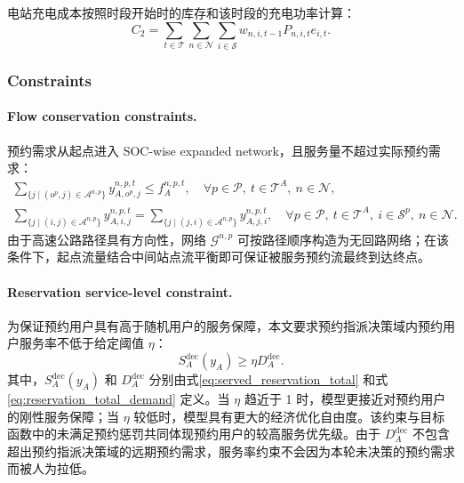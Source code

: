 \documentclass[12pt,hyperref,a4paper,UTF8]{ctexart}
\begin{document}
电站充电成本按照时段开始时的库存和该时段的充电功率计算：
\begin{equation}
C_2 = \sum_{t \in \mathcal{T}}  \sum_{n \in \mathcal{N}} \sum_{i \in \mathcal{S}}
 w_{n,i,t-1}P_{n,i,t}e_{i,t}.
\label{eq:chargingcost}
\end{equation}

\subsubsection{Constraints}

\paragraph{Flow conservation constraints.}
预约需求从起点进入 SOC-wise expanded network，且服务量不超过实际预约需求：
\begin{subequations}
\label{eq:flow}
\begin{gather}
\sum_{\{j\mid (o^p,j)\in \mathcal{A}^{n,p}\}}{y_{A,o^p,j}^{n,p,t}} \leq f_A^{n,p,t},
\quad \forall p\in \mathcal{P},\ t\in \mathcal{T}^{A},\ n \in \mathcal{N},\label{eq:flow1}\\
\sum_{\{j\mid (i,j)\in \mathcal{A}^{n,p}\}}{y_{A,i,j}^{n,p,t}} =
\sum_{\{j\mid (j,i)\in \mathcal{A}^{n,p}\}}{y_{A,j,i}^{n,p,t}},
\quad \forall p\in \mathcal{P},\ t\in \mathcal{T}^{A},\ i\in \mathcal{S}^p,
\ n\in\mathcal{N}.
\label{eq:flow2}
\end{gather}
\end{subequations}
由于高速公路路径具有方向性，网络 $\mathcal{G}^{n,p}$ 可按路径顺序构造为无回路网络；在该条件下，起点流量结合中间站点流平衡即可保证被服务预约流最终到达终点。

\paragraph{Reservation service-level constraint.}
为保证预约用户具有高于随机用户的服务保障，本文要求预约指派决策域内预约用户服务率不低于给定阈值 $\eta$：
\begin{equation}
S_A^{\mathrm{dec}}(y_A)\ge \eta D_A^{\mathrm{dec}}.
\label{eq:reservation_service_rate}
\end{equation}
其中，$S_A^{\mathrm{dec}}(y_A)$ 和 $D_A^{\mathrm{dec}}$ 分别由式\eqref{eq:served_reservation_total} 和式\eqref{eq:reservation_total_demand} 定义。当 $\eta$ 趋近于 1 时，模型更接近对预约用户的刚性服务保障；当 $\eta$ 较低时，模型具有更大的经济优化自由度。该约束与目标函数中的未满足预约惩罚共同体现预约用户的较高服务优先级。由于 $D_A^{\mathrm{dec}}$ 不包含超出预约指派决策域的远期预约需求，服务率约束不会因为本轮未决策的预约需求而被人为拉低。
\end{document}

